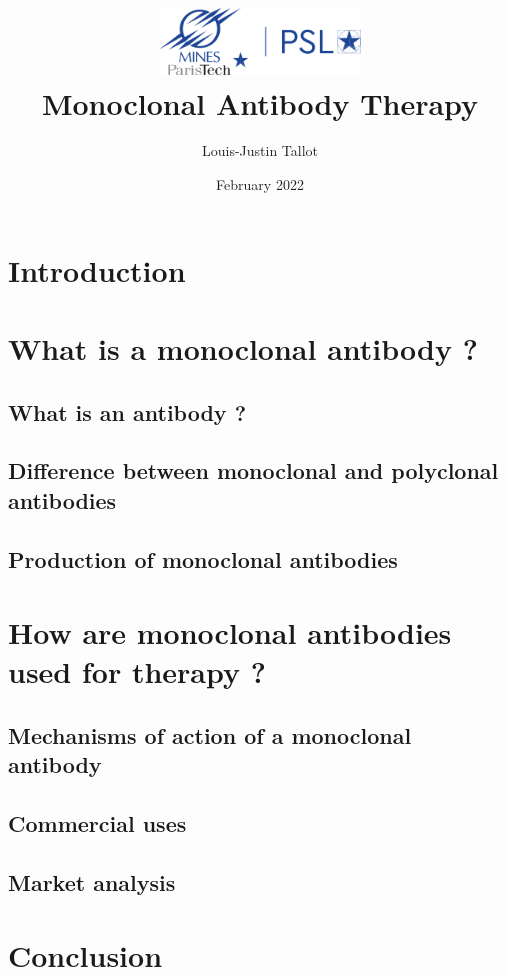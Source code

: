 \documentclass{article}
\title{
  \includegraphics[width=0.4\textwidth]{../Images/Logo_Mines_ParisTech.png}\\
  \vspace{1em}
  \textbf{Monoclonal Antibody Therapy}
}
\author{Louis-Justin Tallot}
\date{February 2022}
\begin{document}
  \maketitle

  \section*{Introduction}
  

  \section{What is a monoclonal antibody ?}

    \subsection{What is an antibody ?}
    

    \subsection{Difference between monoclonal and polyclonal antibodies}
    

    \subsection{Production of monoclonal antibodies}
    \label{sec:monoclonal_antibody_production}
    

  \section{How are monoclonal antibodies used for therapy ?}

    \subsection{Mechanisms of action of a monoclonal antibody}
    

    \subsection{Commercial uses}
    

    \subsection{Market analysis}
    
  
  \section*{Conclusion}
  


  \printbibliography

  \listoffigures
\end{document}
